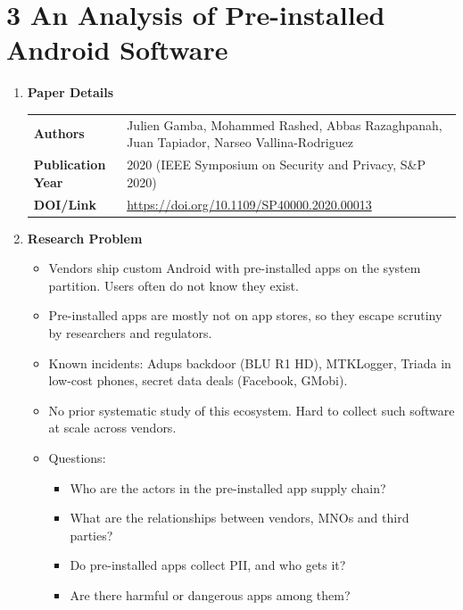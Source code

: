 \documentclass[11pt,a4paper]{article}
\newcommand{\entrypart}[1]{\textbf{\color{accent}#1}\par\vspace{2pt}}
\begin{document}
\newpage

\section{3 An Analysis of Pre-installed Android Software}

\begin{enumerate}

    \item \entrypart{Paper Details}

    \begin{tabular}{@{}>{\bfseries}p{3.2cm} p{11.5cm}@{}}
        Authors          & Julien Gamba, Mohammed Rashed, Abbas Razaghpanah, Juan Tapiador, Narseo Vallina-Rodriguez \\[2pt]
        Publication Year & 2020 (IEEE Symposium on Security and Privacy, S\&P 2020) \\[2pt]
        DOI/Link         & \url{https://doi.org/10.1109/SP40000.2020.00013}
    \end{tabular}

    \item \entrypart{Research Problem}

    \begin{itemize}
        \item Vendors ship custom Android with pre-installed apps on the system partition. Users often do not know they exist.
        \item Pre-installed apps are mostly not on app stores, so they escape scrutiny by researchers and regulators.
        \item Known incidents: Adups backdoor (BLU R1 HD), MTKLogger, Triada in low-cost phones, secret data deals (Facebook, GMobi).
        \item No prior systematic study of this ecosystem. Hard to collect such software at scale across vendors.
        \item Questions:
        \begin{itemize}
            \item Who are the actors in the pre-installed app supply chain?
            \item What are the relationships between vendors, MNOs and third parties?
            \item Do pre-installed apps collect PII, and who gets it?
            \item Are there harmful or dangerous apps among them?
        \end{itemize}
    \end{itemize}


\end{enumerate}
\end{document}
